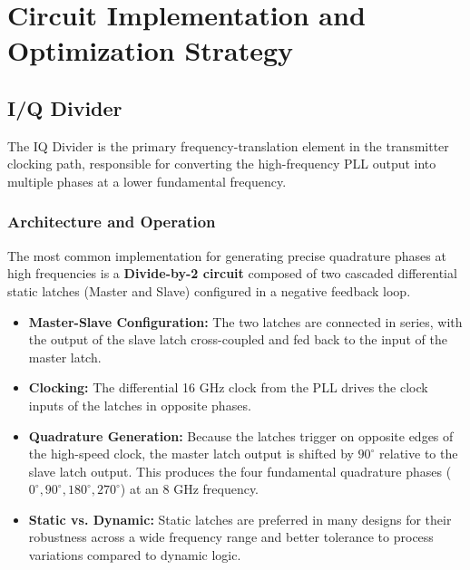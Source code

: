 \documentclass[12pt, a4paper]{report}
\begin{document}
\clearpage
\chapter{Circuit Implementation and Optimization Strategy}
\label{ch:implementation}

\section{I/Q Divider}

The IQ Divider is the primary frequency-translation element in the transmitter clocking path, responsible for converting the high-frequency PLL output into multiple phases at a lower fundamental frequency.

\subsection{Architecture and Operation}
The most common implementation for generating precise quadrature phases at high frequencies is a \textbf{Divide-by-2 circuit} composed of two cascaded differential static latches (Master and Slave) configured in a negative feedback loop.

\begin{itemize}
    \item \textbf{Master-Slave Configuration:} The two latches are connected in series, with the output of the slave latch cross-coupled and fed back to the input of the master latch.
    
    \item \textbf{Clocking:} The differential 16 GHz clock from the PLL drives the clock inputs of the latches in opposite phases.
    
    \item \textbf{Quadrature Generation:} Because the latches trigger on opposite edges of the high-speed clock, the master latch output is shifted by $90^\circ$ relative to the slave latch output. This produces the four fundamental quadrature phases ($0^\circ, 90^\circ, 180^\circ, 270^\circ$) at an 8 GHz frequency.
    
    \item \textbf{Static vs. Dynamic:} Static latches are preferred in many designs for their robustness across a wide frequency range and better tolerance to process variations compared to dynamic logic.
\end{itemize}
\end{document}
